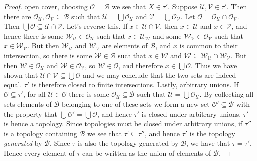 \documentclass{article}
\theoremstyle{plain}
\theoremstyle{normal}
\begin{document}
\begin{proof}
            open cover, choosing $\mathcal{O}=\mathcal{B}$ we see that
            $X\in\tau'$. Suppose $\mathcal{U},\mathcal{V}\in\tau'$. Then there
            are $\mathcal{O}_{\mathcal{U}},\mathcal{O}_{\mathcal{V}}\subseteq\mathcal{B}$
            such that $\mathcal{U}=\bigcup\mathcal{O}_{\mathcal{U}}$ and
            $\mathcal{V}=\bigcup\mathcal{O}_{\mathcal{V}}$. Let
            $\mathcal{O}=\mathcal{O}_{\mathcal{U}}\cap\mathcal{O}_{\mathcal{V}}$.
            Then $\bigcup\mathcal{O}\subseteq\mathcal{U}\cap\mathcal{V}$. Let's
            reverse this. If $x\in\mathcal{U}\cap\mathcal{V}$, then
            $x\in\mathcal{U}$ and $x\in\mathcal{V}$, and hence there is some
            $\mathcal{W}_{\mathcal{U}}\in\mathcal{O}_{\mathcal{U}}$ such that
            $x\in\mathcal{U}_{\mathcal{W}}$ and some
            $\mathcal{W}_{\mathcal{V}}\in\mathcal{O}_{\mathcal{V}}$ such that
            $x\in\mathcal{W}_{\mathcal{V}}$. But then
            $\mathcal{W}_{\mathcal{U}}$ and $\mathcal{W}_{\mathcal{V}}$ are
            elements of $\mathcal{B}$, and $x$ is common to their intersection,
            so there is some $\mathcal{W}\in\mathcal{B}$ such that
            $x\in\mathcal{W}$ and
            $\mathcal{W}\subseteq\mathcal{W}_{\mathcal{U}}\cap\mathcal{W}_{\mathcal{V}}$.
            But then $\mathcal{W}\in\mathcal{O}_{\mathcal{U}}$ and
            $\mathcal{W}\in\mathcal{O}_{\mathcal{V}}$, so
            $\mathcal{W}\in\mathcal{O}$, and therefore
            $x\in\bigcup\mathcal{O}$. Thus we have shown that
            $\mathcal{U}\cap\mathcal{V}\subseteq\bigcup\mathcal{O}$ and we may
            conclude that the two sets are indeed equal. $\tau'$ is therefore
            closed to finite intersections. Lastly, arbitrary unions. If
            $\mathcal{O}\subseteq\tau'$, for all $\mathcal{U}\in\mathcal{O}$
            there is some $\mathcal{O}_{\mathcal{U}}\subseteq\mathcal{B}$ such
            that $\mathcal{U}=\bigcup\mathcal{O}_{\mathcal{U}}$. By collecting
            all sets elements of $\mathcal{B}$ belonging to one of these sets
            we form a new set $\mathcal{O}'\subseteq\mathcal{B}$ with the
            property that $\bigcup\mathcal{O}'=\bigcup\mathcal{O}$, and hence
            $\tau'$ is closed under arbitrary unions. $\tau'$ is hence a
            topology. Since topologies must be closed under arbitrary unions,
            if $\tau''$ is a topology containing $\mathcal{B}$ we see that
            $\tau'\subseteq\tau''$, and hence $\tau'$ is the topology
            \textit{generated} by $\mathcal{B}$. Since $\tau$ is also the
            topology generated by $\mathcal{B}$, we have that $\tau=\tau'$.
            Hence every element of $\tau$ can be written as the union of
            elements of $\mathcal{B}$.
        \end{proof}
\end{document}
